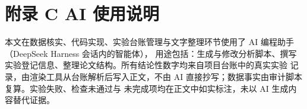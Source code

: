\documentclass[
  a4paper,12pt]{article}
\begin{document}
\section*{附录 C AI
使用说明}\label{ux9644ux5f55-c-ai-ux4f7fux7528ux8bf4ux660e}

本文在数据核实、代码实现、实验台账管理与文字整理环节使用了 AI
编程助手（DeepSeek Harness 会话内的智能体），
用途包括：生成与修改分析脚本、撰写实验登记信息、整理论文结构。所有结论性数字均来自项目台账中的真实实验
记录，由渲染工具从台账解析后写入正文，不由 AI
直接抄写；数据事实由审计脚本复算。实验失败、检查未通过与
未完成项均在正文中如实标注，未以 AI 生成内容替代证据。
\end{document}
